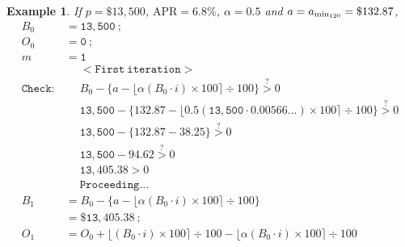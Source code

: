 \documentclass[12pt,letterpaper,oneside]{article}
\newtheorem{example}{Example}[section]
\theoremstyle{remark} %
\begin{document}
	\renewcommand{\rate}{0.00566...}
	\renewcommand{\proportion}{0.5}
	\renewcommand{\amount}{132.87}
	\renewcommand{\balance}{13,500}
	\renewcommand{\interest}{0}
	\renewcommand{\months}{0}
	\renewcommand{\monthsp}{1}
	\renewcommand{\balanceitb}{13,405.38}
	\renewcommand{\interestitb}{38.25}
	\renewcommand{\monthsitb}{1}
	\renewcommand{\monthspitb}{2}
	\renewcommand{\balanceitc}{13,310.49}
	\renewcommand{\interestitc}{76.23}
	\renewcommand{\monthsitc}{2}
	\renewcommand{\monthspitc}{3}
	\renewcommand{\balanceitf}{131.70}
	\renewcommand{\interestitf}{2,443.24}
	\renewcommand{\monthsitf}{119}
	\renewcommand{\monthspitf}{120}
	\renewcommand{\amountfinal}{2,575.69}
	\begin{example}
	If $p=\$13,500$, $\mbox{APR}=6.8\%$, $\alpha=0.5$ and $a=a_{\rm{min_{120}}}=\$132.87$,
	\scriptsize
	\begin{align*}
	B_{0}&=\mathtt{\balance}\ ;\\
	O_{0}&=\mathtt{\interest}\ ;\\
	m&=\mathtt{\monthsp}\\[12pt]
	&\quad\;\mathtt{<First\ iteration>}\\
	\mathtt{Check:}&\quad\;B_{\months}-\Big\{a-\big\lfloor{\alpha\left(B_{\months}\cdot i\right)\times 100}\big\rceil\div 100\Big\}\overset{?}{>}0\\[-6pt]
	&\quad\;\mathtt{\balance}-\Big\{\mathtt{\amount}-\big\lfloor{\mathtt{\proportion}\left(\mathtt{\balance}\cdot \mathtt{\rate}\right)\times 100}\big\rceil\div 100\Big\}\overset{?}{>}0\\[-6pt]
	&\quad\;\mathtt{\balance}-\Big\{\mathtt{\amount}-\mathtt{38.25}\Big\}\overset{?}{>}0\\[-6pt]
	&\quad\;\mathtt{\balance}-\mathtt{94.62}\overset{?}{>}0\\
	&\quad\;\mathtt{13,405.38}>0\\
	&\quad\;\mathtt{Proceeding...}\\[12pt]
	B_{\monthsp}&=B_{\months}-\Big\{a-\big\lfloor{\alpha\left(B_{\months}\cdot i\right)\times 100}\big\rceil\div 100\Big\}\\
	&=\mathtt{\$13,405.38}\ ;\\[12pt]
	O_{\monthsp}&=O_{\months}+\big\lfloor{\left(B_{\months}\cdot i\right)\times 100}\big\rceil\div 100-\big\lfloor{\alpha\left(B_{\months}\cdot i\right)\times 100}\big\rceil\div 100\\

\end{align*}
\end{example}
\end{document}
